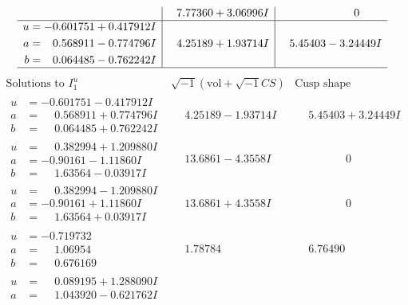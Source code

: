 \documentclass[1p]{elsarticle_modified}
\theoremstyle{definition}
\newcommand{\I}{\sqrt{-1}}
\begin{document}
$$\begin{array}{c|c|c}
 & \phantom{-}7.77360 + 3.06996 I & \phantom{-0.000000 } 0 \\ \hline\begin{aligned}
u &= -0.601751 + 0.417912 I \\
a &= \phantom{-}0.568911 - 0.774796 I \\
b &= \phantom{-}0.064485 - 0.762242 I\end{aligned}
 & \phantom{-}4.25189 + 1.93714 I & \phantom{-}5.45403 - 3.24449 I\\
 \hline 
 \end{array}$$\newpage$$\begin{array}{c|c|c}  
\text{Solutions to }I^u_{1}& \I (\text{vol} + \sqrt{-1}CS) & \text{Cusp shape}\\
 \hline 
\begin{aligned}
u &= -0.601751 - 0.417912 I \\
a &= \phantom{-}0.568911 + 0.774796 I \\
b &= \phantom{-}0.064485 + 0.762242 I\end{aligned}
 & \phantom{-}4.25189 - 1.93714 I & \phantom{-}5.45403 + 3.24449 I \\ \hline\begin{aligned}
u &= \phantom{-}0.382994 + 1.209880 I \\
a &= -0.90161 - 1.11860 I \\
b &= \phantom{-}1.63564 - 0.03917 I\end{aligned}
 & \phantom{-}13.6861 - 4.3558 I & \phantom{-0.000000 } 0 \\ \hline\begin{aligned}
u &= \phantom{-}0.382994 - 1.209880 I \\
a &= -0.90161 + 1.11860 I \\
b &= \phantom{-}1.63564 + 0.03917 I\end{aligned}
 & \phantom{-}13.6861 + 4.3558 I & \phantom{-0.000000 } 0 \\ \hline\begin{aligned}
u &= -0.719732\phantom{ +0.000000I} \\
a &= \phantom{-}1.06954\phantom{ +0.000000I} \\
b &= \phantom{-}0.676169\phantom{ +0.000000I}\end{aligned}
 & \phantom{-}1.78784\phantom{ +0.000000I} & \phantom{-}6.76490\phantom{ +0.000000I} \\ \hline\begin{aligned}
u &= \phantom{-}0.089195 + 1.288090 I \\
a &= \phantom{-}1.043920 - 0.621762 I \\

\end{aligned}
\end{array}$$
\end{document}
